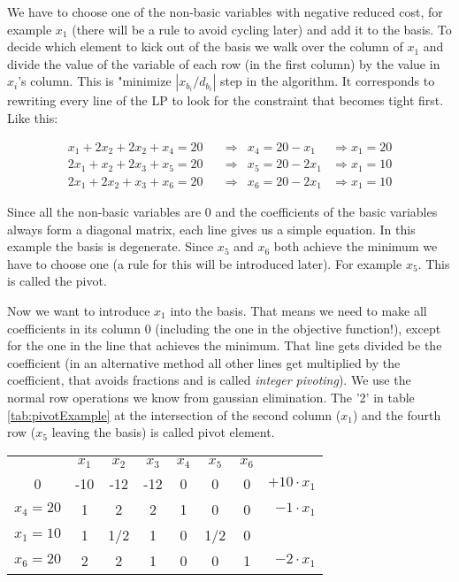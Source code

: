 \begin{Ex}
We have to choose one of the non-basic variables with negative reduced cost, for example $x_1$ (there will be a rule to avoid cycling later) and add it to the basis. To decide which element to kick out of the basis we walk over the column of $x_1$ and divide the value of the variable of each row (in the first column) by the value in $x_i$'s column. This is "minimize $|x_{b_i}/d_{b_i}|$ step in the algorithm. It corresponds to rewriting every line of the LP to look for the constraint that becomes tight first. Like this:

\begin{align*}
x_1 + 2 x_2 + 2 x_2 + x_4 = 20 & \quad \Rightarrow & x_4 = 20 - x_1    & \Rightarrow x_1 = 20\\
2 x_1 +x_2 + 2 x_3 + x_5 = 20  & \quad \Rightarrow & x_5 = 20 - 2 x_1  & \Rightarrow x_1 = 10 \\
2 x_1 + 2 x_2 + x_3 + x_6 = 20 & \quad \Rightarrow & x_6 = 20 - 2 x_1  &\Rightarrow x_1 = 10
\end{align*}

Since all the non-basic variables are 0 and the coefficients of the basic variables always form a diagonal matrix, each line gives us a simple equation. In this example the basis is degenerate. Since $x_5$ and $x_6$ both achieve the minimum we have to choose one (a rule for this will be introduced later). For example $x_5$. This is called the pivot.

Now we want to introduce $x_1$ into the basis. That means we need to make all coefficients in its column 0 (including the one in the objective function!), except for the one in the line that achieves the minimum. That line gets divided be the coefficient (in an alternative method all other lines get multiplied by the coefficient, that avoids fractions and is called \emph{integer pivoting}). We use the normal row operations we know from gaussian elimination. The '2' in table \ref{tab:pivotExample} at the intersection of the second column ($x_1$) and the fourth row ($x_5$ leaving the basis) is called pivot element.

\begin{center}
\begin{tabular}{c|ccccccr}
  & $x_1$ & $x_2$ & $x_3$ & $x_4$ & $x_5$ & $x_6$ \\\cline{1-7}
0 & -10 & -12 & -12 & 0 & 0 & 0 &\hspace{1cm} $+10\cdot x_1$\\\cline{0-6}
$x_4=20$ & 1 & 2   & 2 & 1 &  0   & 0 &\hspace{1cm} $-1\cdot x_1$\\
$x_1=10$ & 1 & 1/2 & 1 & 0 &  1/2 & 0\\
$x_6=20$ & 2 & 2   & 1 & 0 &  0   & 1 &\hspace{1cm} $-2\cdot x_1$\\
\end{tabular}
\end{center}


\end{Ex}
